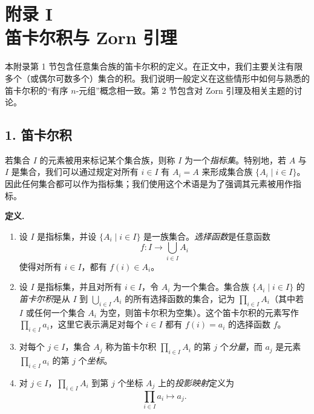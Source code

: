 
\chapter*{附录 I\\笛卡尔积与 Zorn 引理}

本附录第 1 节包含任意集合族的笛卡尔积的定义。在正文中，我们主要关注有限多个（或偶尔可数多个）集合的积。我们说明一般定义在这些情形中如何与熟悉的笛卡尔积的“有序 $n$-元组”概念相一致。第 2 节包含对 Zorn 引理及相关主题的讨论。

\section*{1. 笛卡尔积}

若集合 $I$ 的元素被用来标记某个集合族，则称 $I$ 为一个\emph{指标集}。特别地，若 $A$ 与 $I$ 是集合，我们可以通过规定对所有 $i\in I$ 有 $A_i=A$ 来形成集合族 $\{A_i\mid i\in I\}$。因此任何集合都可以作为指标集；我们使用这个术语是为了强调其元素被用作指标。

\noindent\textbf{定义.}
\begin{enumerate}[label=(\arabic*)]
  \item 设 $I$ 是指标集，并设 $\{A_i\mid i\in I\}$ 是一族集合。\emph{选择函数}是任意函数
  \[
    f:I\longrightarrow \bigcup_{i\in I}A_i
  \]
  使得对所有 $i\in I$，都有 $f(i)\in A_i$。

  \item 设 $I$ 是指标集，并且对所有 $i\in I$，令 $A_i$ 为一个集合。集合族 $\{A_i\mid i\in I\}$ 的\emph{笛卡尔积}是从 $I$ 到 $\bigcup_{i\in I}A_i$ 的所有选择函数的集合，记为 $\prod_{i\in I}A_i$（其中若 $I$ 或任何一个集合 $A_i$ 为空，则笛卡尔积为空集）。这个笛卡尔积的元素写作 $\prod_{i\in I}a_i$，这里它表示满足对每个 $i\in I$ 都有 $f(i)=a_i$ 的选择函数 $f$。

  \item 对每个 $j\in I$，集合 $A_j$ 称为笛卡尔积 $\prod_{i\in I}A_i$ 的第 $j$ 个\emph{分量}，而 $a_j$ 是元素 $\prod_{i\in I}a_i$ 的第 $j$ 个\emph{坐标}。

  \item 对 $j\in I$，$\prod_{i\in I}A_i$ 到第 $j$ 个坐标 $A_j$ 上的\emph{投影映射}定义为
  \[
    \prod_{i\in I}a_i\longmapsto a_j.
  \]
\end{enumerate}

